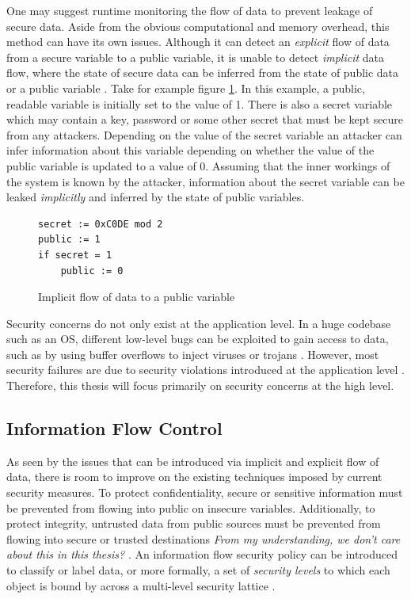 \documentclass[twocolumn]{article}
\begin{document}
One may suggest runtime monitoring the flow of data to prevent leakage of secure data. Aside from the obvious computational and memory overhead, this method can have its own issues. Although it can detect an \textit{explicit} flow of data from a secure variable to a public variable, it is unable to detect \textit{implicit} data flow, where the state of secure data can be inferred from the state of public data or a public variable \cite{denning1977certification}. Take for example figure \ref{fig:implicit}. In this example, a public, readable variable is initially set to the value of 1. There is also a secret variable which may contain a key, password or some other secret that must be kept secure from any attackers. Depending on the value of the secret variable an attacker can infer information about this variable depending on whether the value of the public variable is updated to a value of 0. Assuming that the inner workings of the system is known by the attacker, information about the secret variable can be leaked \textit{implicitly} and inferred by the state of public variables.

\begin{figure}
    \begin{lstlisting}
secret := 0xC0DE mod 2
public := 1
if secret = 1
    public := 0
        \end{lstlisting}
    \caption{Implicit flow of data to a public variable}
    \label{fig:implicit}
\end{figure}

Security concerns do not only exist at the application level. In a huge codebase such as an OS, different low-level bugs can be exploited to gain access to data, such as by using buffer overflows to inject viruses or trojans \cite{agten2012recent}. However, most security failures are due to security violations introduced at the application level \cite{jang2010empirical}. Therefore, this thesis will focus primarily on security concerns at the high level.

\subsection{Information Flow Control}
As seen by the issues that can be introduced via implicit and explicit flow of data, there is room to improve on the existing techniques imposed by current security measures. To protect confidentiality, secure or sensitive information must be prevented from flowing into public on insecure variables. Additionally, to protect integrity, untrusted data from public sources must be prevented from flowing into secure or trusted destinations \textit{From my understanding, we don't care about this in this thesis?} \cite{balliu2014logics}. An information flow security policy can be introduced to classify or label data, or more formally, a set of \textit{security levels} to which each object is bound by across a multi-level security lattice \cite{denning1976lattice}.
\end{document}
